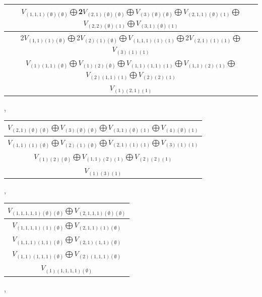 \documentclass[letterpaper,11pt]{article}
\begin{document}
	\newline 
	\begin{tabular}{| c |}
		\hline
		$V_{(1,1,1)(\emptyset)(\emptyset)}$$\bigoplus$2$V_{(2,1)(\emptyset)(\emptyset)}$$\bigoplus$$V_{(3)(\emptyset)(\emptyset)}$$\bigoplus$$V_{(2,1,1)(\emptyset)(1)}$$\bigoplus$$V_{(2,2)(\emptyset)(1)}$$\bigoplus$$V_{(3,1)(\emptyset)(1)}$\\
		\hline
		2$V_{(1,1)(1)(\emptyset)}$$\bigoplus$2$V_{(2)(1)(\emptyset)}$$\bigoplus$$V_{(1,1,1)(1)(1)}$$\bigoplus$2$V_{(2,1)(1)(1)}$$\bigoplus$$V_{(3)(1)(1)}$\\
		\hline
		$V_{(1)(1,1)(\emptyset)}$$\bigoplus$$V_{(1)(2)(\emptyset)}$$\bigoplus$$V_{(1,1)(1,1)(1)}$$\bigoplus$$V_{(1,1)(2)(1)}$$\bigoplus$$V_{(2)(1,1)(1)}$$\bigoplus$$V_{(2)(2)(1)}$\\
		\hline
		$V_{(1)(2,1)(1)}$\\
		\hline
	\end{tabular}, 
	\newline 
	\begin{tabular}{| c |}
		\hline
		$V_{(2,1)(\emptyset)(\emptyset)}$$\bigoplus$$V_{(3)(\emptyset)(\emptyset)}$$\bigoplus$$V_{(3,1)(\emptyset)(1)}$$\bigoplus$$V_{(4)(\emptyset)(1)}$\\
		\hline
		$V_{(1,1)(1)(\emptyset)}$$\bigoplus$$V_{(2)(1)(\emptyset)}$$\bigoplus$$V_{(2,1)(1)(1)}$$\bigoplus$$V_{(3)(1)(1)}$\\
		\hline
		$V_{(1)(2)(\emptyset)}$$\bigoplus$$V_{(1,1)(2)(1)}$$\bigoplus$$V_{(2)(2)(1)}$\\
		\hline
		$V_{(1)(3)(1)}$\\
		\hline
	\end{tabular}, 
	\begin{tabular}{| c |}
		\hline
		$V_{(1,1,1,1,1)(\emptyset)(\emptyset)}$$\bigoplus$$V_{(2,1,1,1)(\emptyset)(\emptyset)}$\\
		\hline
		$V_{(1,1,1,1)(1)(\emptyset)}$$\bigoplus$$V_{(2,1,1)(1)(\emptyset)}$\\
		\hline
		$V_{(1,1,1)(1,1)(\emptyset)}$$\bigoplus$$V_{(2,1)(1,1)(\emptyset)}$\\
		\hline
		$V_{(1,1)(1,1,1)(\emptyset)}$$\bigoplus$$V_{(2)(1,1,1)(\emptyset)}$\\
		\hline
		$V_{(1)(1,1,1,1)(\emptyset)}$\\
		\hline
	\end{tabular}, 
	\newline 
\end{document}
